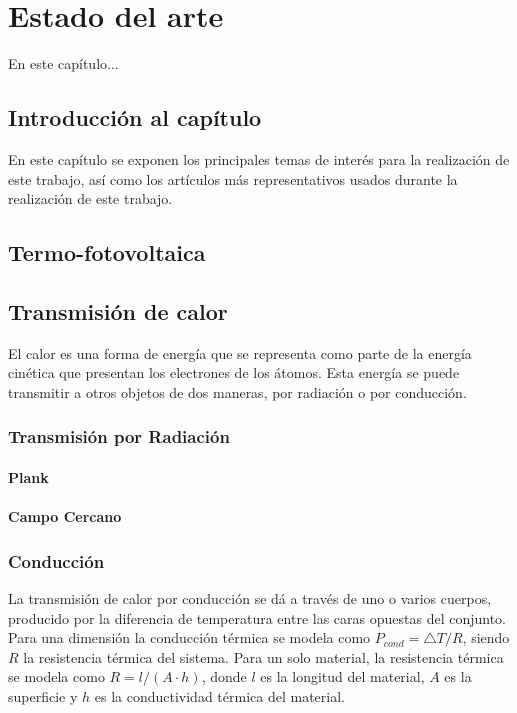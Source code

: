 \chapter{Estado del arte}


En este capítulo...
\cite{noauthor_parallel-plate_nodate}
\cite{doi:MicroGapTPV}
\cite{doi:Thermoionic_Campbell}
\cite{doi:Near-field_ThinFilm}

\section{Introducción al capítulo}
En este capítulo se exponen los principales temas de interés para la realización de este trabajo, así como los artículos más representativos usados durante la realización de este trabajo.
\section{Termo-fotovoltaica}

\section{Transmisión de calor}
El calor es una forma de energía que se representa como parte de la energía cinética que presentan los electrones de los átomos. Esta energía se puede transmitir a otros objetos de dos maneras, por radiación o por conducción.
\subsection{Transmisión por Radiación}

\subsubsection{Plank}
\subsubsection{Campo Cercano}
\subsection{Conducción}
La transmisión de calor por conducción se dá a través de uno o varios cuerpos, producido por la diferencia de temperatura entre las caras opuestas del conjunto. Para una dimensión la conducción térmica se modela como $P_{cond}={\bigtriangleup T}/{R} $, siendo $R$ la resistencia térmica del sistema.
Para un solo material, la resistencia térmica se modela como $R = l/{\left(A\cdot h\right)}$, donde $l$ es la longitud del material, $A$ es la superficie y $h$ es la conductividad térmica del material.\\

